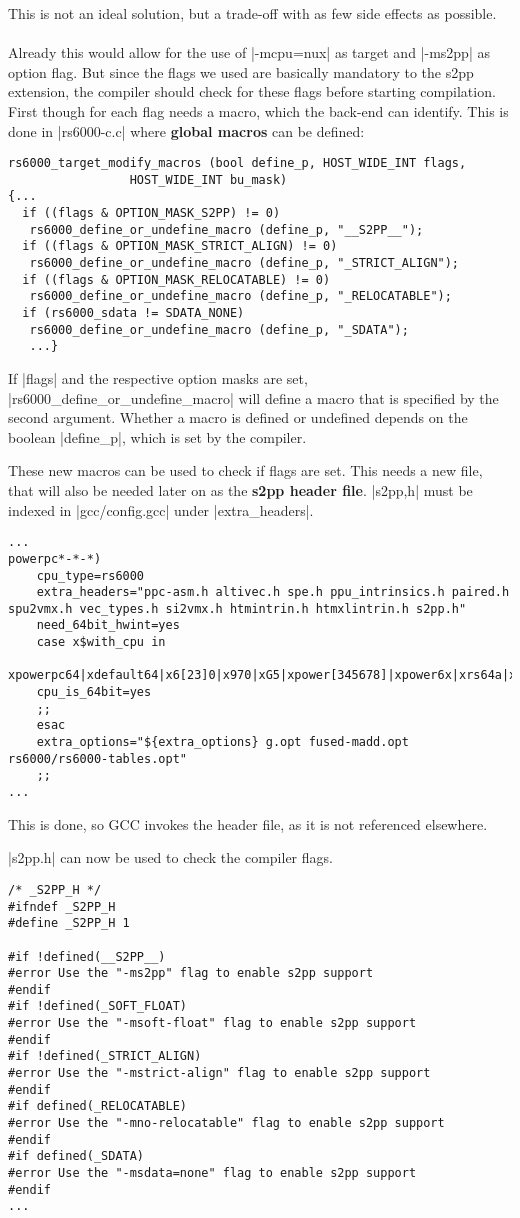 This is not an ideal solution, but a trade-off with as few side effects as possible.
\\
\\
Already this would allow for the use of |-mcpu=nux| as target and |-ms2pp| as option flag.
But since the flags we used are basically mandatory to the \ac{s2pp} extension, the compiler should check for these flags before starting compilation.
First though for each flag needs a macro, which the back-end can identify.
This is done in |rs6000-c.c| where \textbf{global macros} can be defined:
\begin{lstlisting}
rs6000_target_modify_macros (bool define_p, HOST_WIDE_INT flags,
                 HOST_WIDE_INT bu_mask)
{...
  if ((flags & OPTION_MASK_S2PP) != 0)
   rs6000_define_or_undefine_macro (define_p, "__S2PP__");
  if ((flags & OPTION_MASK_STRICT_ALIGN) != 0)
   rs6000_define_or_undefine_macro (define_p, "_STRICT_ALIGN");
  if ((flags & OPTION_MASK_RELOCATABLE) != 0)
   rs6000_define_or_undefine_macro (define_p, "_RELOCATABLE");
  if (rs6000_sdata != SDATA_NONE)
   rs6000_define_or_undefine_macro (define_p, "_SDATA");
   ...}
\end{lstlisting}

If |flags| and the respective option masks are set, |rs6000_define_or_undefine_macro| will define a macro that is specified by the second argument.
Whether a macro is defined or undefined depends on the boolean |define_p|, which is set by the compiler.

These new macros can be used to check if flags are set.
This needs a new file, that will also be needed later on as the \textbf{\ac{s2pp} header file}.
|s2pp,h| must be indexed in |gcc/config.gcc| under |extra_headers|.
\begin{lstlisting}
...
powerpc*-*-*)
    cpu_type=rs6000
    extra_headers="ppc-asm.h altivec.h spe.h ppu_intrinsics.h paired.h spu2vmx.h vec_types.h si2vmx.h htmintrin.h htmxlintrin.h s2pp.h"
    need_64bit_hwint=yes
    case x$with_cpu in
    xpowerpc64|xdefault64|x6[23]0|x970|xG5|xpower[345678]|xpower6x|xrs64a|xcell|xa2|xe500mc64|xe5500|Xe6500)
    cpu_is_64bit=yes
    ;;
    esac
    extra_options="${extra_options} g.opt fused-madd.opt rs6000/rs6000-tables.opt"
    ;;
...
\end{lstlisting}
This is done, so \ac{GCC} invokes the header file, as it is not referenced elsewhere.

|s2pp.h| can now be used to check the compiler flags.
\begin{lstlisting}
/* _S2PP_H */
#ifndef _S2PP_H
#define _S2PP_H 1

#if !defined(__S2PP__)
#error Use the "-ms2pp" flag to enable s2pp support
#endif
#if !defined(_SOFT_FLOAT)
#error Use the "-msoft-float" flag to enable s2pp support
#endif
#if !defined(_STRICT_ALIGN)
#error Use the "-mstrict-align" flag to enable s2pp support
#endif
#if defined(_RELOCATABLE)
#error Use the "-mno-relocatable" flag to enable s2pp support
#endif
#if defined(_SDATA)
#error Use the "-msdata=none" flag to enable s2pp support
#endif
...
\end{lstlisting}

